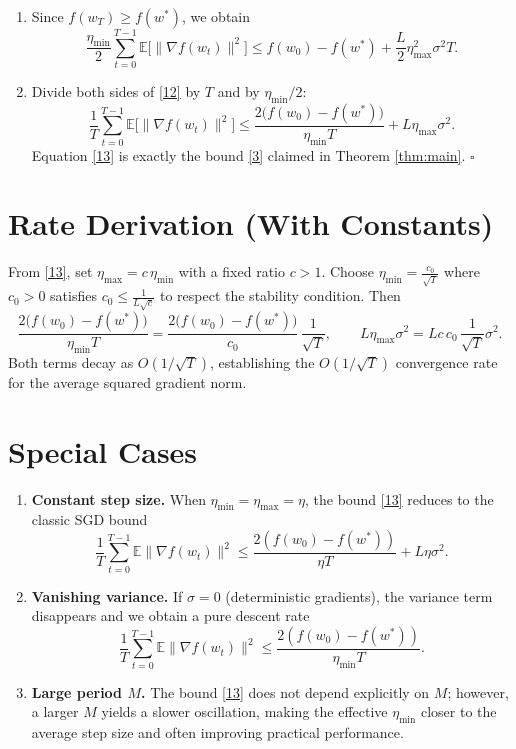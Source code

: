 \documentclass[11pt]{article}
\begin{document}
\begin{enumerate}
\item[Step 9.] Since $f(w_T)\ge f(w^*)$, we obtain
\[
\frac{\eta_{\min}}{2}\sum_{t=0}^{T-1}\mathbb{E}\big[\|\nabla f(w_t)\|^{2}\big]
\le
f(w_0)-f(w^*) + \frac{L}{2}\eta_{\max}^{2}\sigma^{2}T .
\tag{12}
\]

\item[Step 10.] Divide both sides of \eqref{12} by $T$ and by $\eta_{\min}/2$:
\[
\frac1T\sum_{t=0}^{T-1}\mathbb{E}\big[\|\nabla f(w_t)\|^{2}\big]
\le
\frac{2\big(f(w_0)-f(w^*)\big)}{\eta_{\min}T}
+ L\eta_{\max}\sigma^{2}.
\tag{13}
\]
Equation \eqref{13} is exactly the bound \eqref{3} claimed in Theorem \ref{thm:main}. \hfill $\square$
\end{enumerate}

\section*{Rate Derivation (With Constants)}
From \eqref{13}, set $\eta_{\max}=c\,\eta_{\min}$ with a fixed ratio $c>1$.
Choose $\eta_{\min}= \frac{c_0}{\sqrt{T}}$ where $c_0>0$ satisfies $c_0\le \frac{1}{L\sqrt{c}}$ to respect the stability condition.
Then
\[
\frac{2\big(f(w_0)-f(w^*)\big)}{\eta_{\min}T}
= \frac{2\big(f(w_0)-f(w^*)\big)}{c_0}\,\frac{1}{\sqrt{T}},
\qquad
L\eta_{\max}\sigma^{2}=L c\,c_0\,\frac{1}{\sqrt{T}}\sigma^{2}.
\]
Both terms decay as $O(1/\sqrt{T})$, establishing the $O(1/\sqrt{T})$ convergence rate for the average squared gradient norm.

\section*{Special Cases}
\begin{enumerate}[label=\arabic*.]
\item \textbf{Constant step size.} When $\eta_{\min}=\eta_{\max}=\eta$, the bound \eqref{13} reduces to the classic SGD bound
\[
\frac1T\sum_{t=0}^{T-1}\mathbb{E}\|\nabla f(w_t)\|^{2}
\le \frac{2(f(w_0)-f(w^*))}{\eta T}+L\eta\sigma^{2}.
\]

\item \textbf{Vanishing variance.} If $\sigma=0$ (deterministic gradients), the variance term disappears and we obtain a pure descent rate
\[
\frac1T\sum_{t=0}^{T-1}\mathbb{E}\|\nabla f(w_t)\|^{2}
\le \frac{2(f(w_0)-f(w^*))}{\eta_{\min}T}.
\]

\item \textbf{Large period $M$.} The bound \eqref{13} does not depend explicitly on $M$; however, a larger $M$ yields a slower oscillation, making the effective $\eta_{\min}$ closer to the average step size and often improving practical performance.
\end{enumerate}
\end{document}
